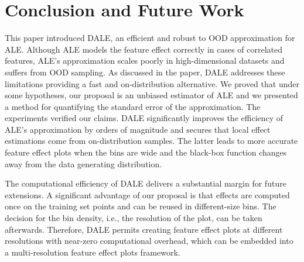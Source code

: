 \documentclass[wcp]{jmlr}
\begin{document}
\section{Conclusion and Future Work} This paper introduced DALE, an efficient and robust to OOD approximation for ALE. Although ALE models the feature effect correctly in cases of correlated features, ALE's approximation scales poorly in high-dimensional datasets and suffers from OOD sampling. As discussed in the paper, DALE addresses these limitations providing a fast and on-distribution alternative. We proved that under some hypotheses, our proposal is an unbiased estimator of ALE and we presented a method for quantifying the standard error of the approximation. The experiments verified our claims. DALE significantly improves the efficiency of ALE's approximation by orders of magnitude and secures that local effect estimations come from on-distribution samples. The latter leads to more accurate feature effect plots when the bins are wide and the black-box function changes away from the data generating distribution.

The computational efficiency of DALE delivers a substantial margin for future extensions. A significant advantage of our proposal is that effects are computed once on the training set points and can be reused in different-size bins. The decision for the bin density, i.e., the resolution of the plot, can be taken afterwards. Therefore, DALE permits creating feature effect plots at different resolutions with near-zero computational overhead, which can be embedded into a multi-resolution feature effect plots framework.




%


\appendix
\end{document}
